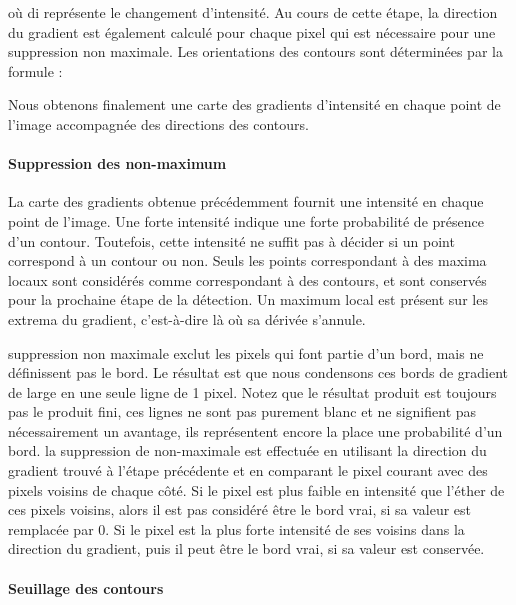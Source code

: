  où di représente le changement d'intensité. Au cours de cette étape, la direction du gradient est également calculé pour chaque pixel qui est nécessaire pour une suppression non maximale. Les orientations des contours sont déterminées par la formule :


Nous obtenons finalement une carte des gradients d'intensité en chaque point de l'image accompagnée des directions des contours.



\paragraph{Suppression des non-maximum}


La carte des gradients obtenue précédemment fournit une intensité en chaque point de l'image. Une forte intensité indique une forte probabilité de présence d'un contour. Toutefois, cette intensité ne suffit pas à décider si un point correspond à un contour ou non. Seuls les points correspondant à des maxima locaux sont considérés comme correspondant à des contours, et sont conservés pour la prochaine étape de la détection. Un maximum local est présent sur les extrema du gradient, c'est-à-dire là où sa dérivée s'annule.



suppression non maximale exclut les pixels qui font partie d'un bord, mais ne définissent pas le bord. Le résultat est que nous condensons ces bords de gradient de large en une seule ligne de 1 pixel. Notez que le résultat produit est toujours pas le produit fini, ces lignes ne sont pas purement blanc et ne signifient pas nécessairement un avantage, ils représentent encore la place une probabilité d'un bord. la suppression de non-maximale est effectuée en utilisant la direction du gradient trouvé à l'étape précédente et en comparant le pixel courant avec des pixels voisins de chaque côté. Si le pixel est plus faible en intensité que l'éther de ces pixels voisins, alors il est pas considéré être le bord vrai, si sa valeur est remplacée par 0. Si le pixel est la plus forte intensité de ses voisins dans la direction du gradient, puis il peut être le bord vrai, si sa valeur est conservée.


\paragraph{Seuillage des contours}


